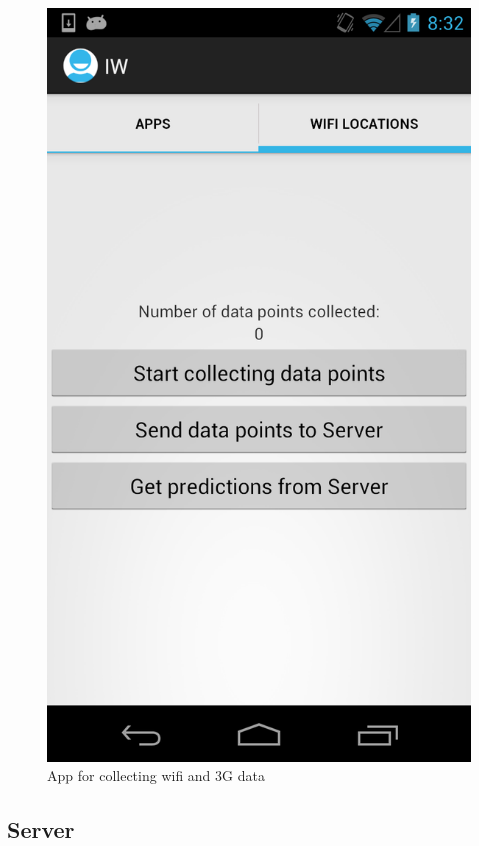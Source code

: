 \documentclass[12pt, fleqn]{article}
\begin{document}
\medskip
\begin{figure}[htp]
\centering
\includegraphics[scale=0.2]{img/app-screenshot-wifi.png}
\caption{App for collecting wifi and 3G data\label{fig-app-screenshot-wifi}}
\end{figure}
\medskip

\subsection{Server} 
\label{time-to-wifi-server}
\end{document}
